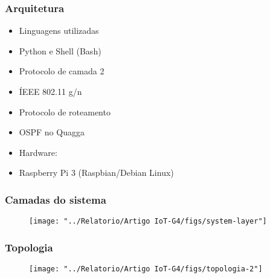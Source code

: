 
\begin{frame}
\frametitle{Arquitetura}
\begin{itemize}
	\item Linguagens utilizadas
	\item Python e Shell (Bash)
	\item Protocolo de camada 2
	\item ÍEEE 802.11 g/n
	\item Protocolo de roteamento
	\item OSPF no Quagga
	\item Hardware:
	\item Raspberry Pi 3 (Raspbian/Debian Linux)
\end{itemize}

\end{frame}


\begin{frame}
	\frametitle{Camadas do sistema}

	\begin{figure}[h]
		\centering
		\texttt{[image: "../Relatorio/Artigo IoT-G4/figs/system-layer"]}
		\label{System-Layers}
 	\end{figure}

\end{frame}


\begin{frame}
	\frametitle{Topologia}

	\begin{figure}[h]
		\centering
		\texttt{[image: "../Relatorio/Artigo IoT-G4/figs/topologia-2"]}
		\label{topologia}
 	\end{figure}

\end{frame}


